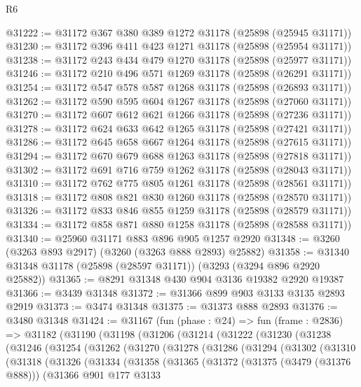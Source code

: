\begin{lexlean}{R6}
\begin{coremodule}
@31222 := @31172 @367 @380 @389 @1272 @31178 (@25898 (@25945 @31171))
@31230 := @31172 @396 @411 @423 @1271 @31178 (@25898 (@25954 @31171))
@31238 := @31172 @243 @434 @479 @1270 @31178 (@25898 (@25977 @31171))
@31246 := @31172 @210 @496 @571 @1269 @31178 (@25898 (@26291 @31171))
@31254 := @31172 @547 @578 @587 @1268 @31178 (@25898 (@26893 @31171))
@31262 := @31172 @590 @595 @604 @1267 @31178 (@25898 (@27060 @31171))
@31270 := @31172 @607 @612 @621 @1266 @31178 (@25898 (@27236 @31171))
@31278 := @31172 @624 @633 @642 @1265 @31178 (@25898 (@27421 @31171))
@31286 := @31172 @645 @658 @667 @1264 @31178 (@25898 (@27615 @31171))
@31294 := @31172 @670 @679 @688 @1263 @31178 (@25898 (@27818 @31171))
@31302 := @31172 @691 @716 @759 @1262 @31178 (@25898 (@28043 @31171))
@31310 := @31172 @762 @775 @805 @1261 @31178 (@25898 (@28561 @31171))
@31318 := @31172 @808 @821 @830 @1260 @31178 (@25898 (@28570 @31171))
@31326 := @31172 @833 @846 @855 @1259 @31178 (@25898 (@28579 @31171))
@31334 := @31172 @858 @871 @880 @1258 @31178 (@25898 (@28588 @31171))
@31340 := @25960 @31171 @883 @896 @905 @1257 @2920
@31348 := @3260 (@3263 @893 @2917) (@3260 (@3263 @888 @2893) @25882)
@31358 := @31340 @31348 @31178 (@25898 (@28597 @31171)) (@3293 (@3294 @896 @2920 @25882))
@31365 := @8291 @31348 @430 @904 @3136 @19382 @2920 @19387
@31366 := @3439 @31348
@31372 := @31366 @899 @903 @3133 @3135 @2893 @2919
@31373 := @3474 @31348
@31375 := @31373 @888 @2893
@31376 := @3480 @31348
@31424 := @31167
    (fun (phase : @24) =>
    fun (frame : @2836) =>
    @31182
      (@31190
        (@31198
          (@31206
            (@31214
              (@31222
                (@31230
                  (@31238
                    (@31246
                      (@31254
                        (@31262
                          (@31270
                            (@31278
                              (@31286
                                (@31294
                                  (@31302
                                    (@31310
                                      (@31318
                                        (@31326
                                          (@31334
                                            (@31358
                                              (@31365
                                                (@31372
                                                  (@31375 (@3479 (@31376 @888)))
                                                  (@31366
                                                    @901
                                                    @177
                                                    @3133

\end{coremodule}
\end{lexlean}

